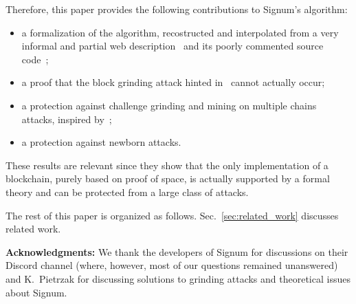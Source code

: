 Therefore, this paper provides the following contributions to Signum's algorithm:
%
\begin{itemize}
\item a formalization of the algorithm, recostructed and interpolated from a very informal and partial
  web description~\cite{SignumPlotting} and its poorly commented source code~\cite{SignumSource};
\item a proof that the block grinding attack hinted in~\cite{ParkKFGAP18} cannot actually occur;
\item a protection against challenge grinding and mining on multiple chains attacks, inspired by~\cite{ParkKFGAP18};
\item a protection against newborn attacks.
\end{itemize}
%
These results are relevant since they show that the only implementation
of a blockchain, purely based on proof of space, is actually supported by a formal theory
and can be protected from a large class of attacks.

The rest of this paper is organized as follows.
Sec.~\ref{sec:related_work} discusses related work.

\vspace*{1ex}
\textbf{Acknowledgments:}
We thank the developers of Signum for discussions on their Discord channel (where, however, most
of our questions remained unanswered) and K.\ Pietrzak for discussing solutions to
grinding attacks and theoretical issues about Signum.
